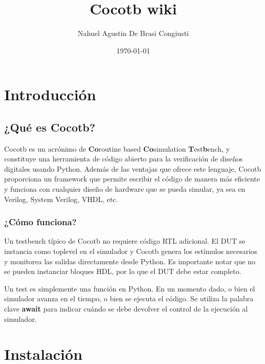 \documentclass[a4paper,12pt]{article}
\title{Cocotb wiki}
\author{Nahuel Agustin De Brasi Congiusti}
\date{\today}
\begin{document}
\maketitle

\setcounter{tocdepth}{2}
\setcounter{secnumdepth}{2}

\newpage

\tableofcontents

\newpage

\section{Introducción}

\subsection{¿Qué es Cocotb?}

Cocotb es un acrónimo de \textbf{Co}routine based \textbf{Co}simulation \textbf{T}est\textbf{b}ench, y constituye una herramienta de código abierto para la verificación de diseños digitales usando Python. Además de las ventajas que ofrece este lenguaje, Cocotb proporciona un framework que permite escribir el código de manera más eficiente y funciona con cualquier diseño de hardware que se pueda simular, ya sea en Verilog, System Verilog, VHDL, etc.

\subsubsection{¿Cómo funciona?}

Un testbench típico de Cocotb no requiere código RTL adicional. El DUT se instancia como toplevel en el simulador y Cocotb genera los estímulos necesarios y monitorea las salidas directamente desde Python. Es importante notar que no se pueden instanciar bloques HDL, por lo que el DUT debe estar completo.

Un test es simplemente una función en Python. En un momento dado, o bien el simulador avanza en el tiempo, o bien se ejecuta el código. Se utiliza la palabra clave \textbf{await} para indicar cuándo se debe devolver el control de la ejecución al simulador.



\newpage

\section{Instalación}
\end{document}
